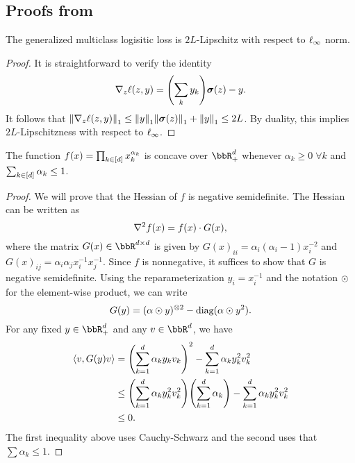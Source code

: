 
\subsection{Proofs from }

\begin{lemma}
\label{lem:multiclass_lipschitz}
The generalized multiclass logisitic loss is $2L$-Lipschitz with respect to $\ell_{\infty}$ norm.
\end{lemma}
\begin{proof}
It is straightforward to verify the identity
\[
\grad{}_z\ls(z,y) = \prn*{\sum_{k}y_k}\mb{\sigma}(z) - y.
\]
It follows that $\nrm*{\grad{}_z\ls(z,y)}_{1}\leq{}\nrm*{y}_{1}\nrm*{\mb{\sigma}(z)}_{1} + \nrm*{y}_1\leq{}2L$. By duality, this implies $2L$-Lipschitzness with respect to $\ell_{\infty}$.
\end{proof}

\begin{lemma}
\label{lem:monomial_concave}
The function $f(x) = \prod_{k\in[d]}x_{k}^{\alpha_{k}}$ is concave over $\bbR_{+}^{d}$ whenever $\alpha_k\geq{}0\;\forall{}k$ and $\sum_{k\in[d]}\alpha_{k}\leq{}1$.
\end{lemma}
\begin{proof}
We will prove that the Hessian of $f$ is negative semidefinite. The Hessian can be written as
\[
\nabla^{2}f(x) = f(x)\cdot{}G(x),
\]
where the matrix $G(x)\in\bbR^{d\times{}d}$ is given by $G(x)_{ii} = \alpha_i(\alpha_i-1)x_{i}^{-2}$ and $G(x)_{ij}=\alpha_i\alpha_jx_i^{-1}x_j^{-1}$. Since $f$ is nonnegative, it suffices to show that $G$ is negative semidefinite. Using the reparameterization $y_i=x_i^{-1}$ and the notation $\odot$ for the element-wise product, we can write
\[
G(y) = (\alpha\odot{}y)^{\otimes{}{}2} - \textrm{diag}(\alpha\odot{}y^{2}).
\]
For any fixed $y\in\bbR^{d}_{+}$ and any $v\in\bbR^{d}$, we have
\begin{align*}
\tri*{v, G(y)v} &= \prn*{\sum_{k=1}^{d}\alpha_ky_kv_k}^{2} - \sum_{k=1}^{d}\alpha_{k}y_k^{2}v_k^{2} \\
&\leq{} \prn*{\sum_{k=1}^{d}\alpha_ky_k^{2}v_k^{2}}\prn*{\sum_{k=1}^{d}\alpha_k} - \sum_{k=1}^{d}\alpha_{k}y_k^{2}v_k^{2}\\
&\leq{} 0.
\end{align*}
The first inequality above uses Cauchy-Schwarz and the second uses that $\sum\alpha_k\leq{}1$.
\end{proof}

